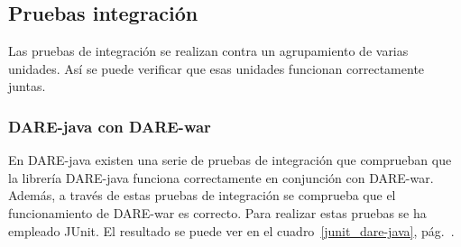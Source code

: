 \subsection{Pruebas integración}

Las pruebas de integración se realizan contra un agrupamiento de
varias unidades. Así se puede verificar que esas unidades funcionan
correctamente juntas.

\subsubsection{DARE-java con DARE-war}

En DARE-java existen una serie de pruebas de integración que
comprueban que la librería DARE-java funciona correctamente en
conjunción con DARE-war. Además, a través de estas pruebas de
integración se comprueba que el funcionamiento de DARE-war es
correcto. Para realizar estas pruebas se ha empleado JUnit. El
resultado se puede ver en el cuadro~\ref{junit_dare-java},
pág.~\pageref{junit_dare-java}.

